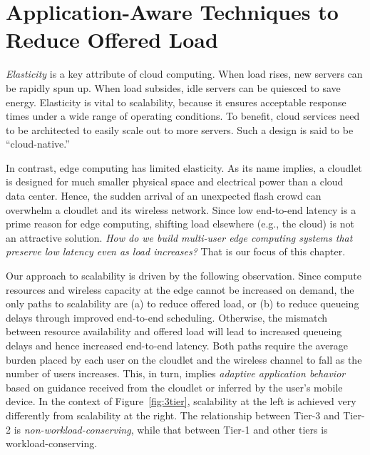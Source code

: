 \chapter{Application-Aware Techniques to Reduce Offered Load}
\label{chapter: load}

{\em Elasticity} is a key attribute of cloud computing.  When load
rises, new servers can be rapidly spun up.  When load subsides, idle
servers can be quiesced to save energy.  Elasticity is vital to
scalability, because it ensures acceptable response times under a wide
range of operating conditions.  To benefit, cloud services need to be
architected to easily scale out to more servers.  Such a design is
said to be ``cloud-native.''

In contrast, edge computing has limited elasticity.  As its name
implies, a cloudlet is designed for much smaller physical space and
electrical power than a cloud data center.  Hence, the sudden arrival
of an unexpected flash crowd can overwhelm a cloudlet and its wireless
network.  Since low end-to-end latency is a prime reason for edge
computing, shifting load elsewhere (e.g., the cloud) is not an
attractive solution.  {\em How do we build multi-user edge computing
  systems that preserve low latency even as load increases?}  That is
our focus of this chapter.

Our approach to scalability is driven by the following observation.
Since compute resources and wireless capacity at the edge cannot be
increased on demand, the only paths to scalability are (a) to reduce
offered load, or (b) to reduce queueing delays through improved
end-to-end scheduling.  Otherwise, the mismatch between resource
availability and offered load will lead to increased queueing delays
and hence increased end-to-end latency.  Both paths require the
average burden placed by each user on the cloudlet and the wireless
channel to fall as the number of users increases.  This, in turn,
implies {\em adaptive application behavior} based on guidance received
from the cloudlet or inferred by the user's mobile device.  In the
context of Figure~\ref{fig:3tier}, scalability at the left is achieved
very differently from scalability at the right.  The relationship
between Tier-3 and Tier-2 is {\em non-workload-conserving}, while that
between Tier-1 and other tiers is workload-conserving.

